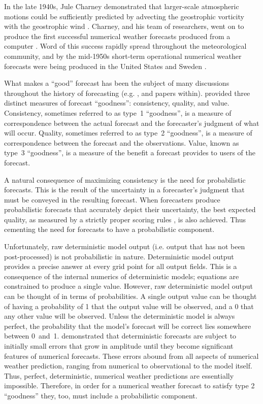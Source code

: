In the late 1940s, Jule Charney demonstrated that larger-scale atmospheric motions could be sufficiently predicted by advecting the geostrophic vorticity with the geostrophic wind \citep{Charney1947}.
Charney, and his team of researchers, went on to produce the first successful numerical weather forecasts produced from a computer \cite{Charney1950}.
Word of this success rapidly spread throughout the meteorological community, and by the mid-1950s short-term operational numerical weather forecasts were being produced in the United States and Sweden \citep{Lewis2005}.







What makes a ``good'' forecast has been the subject of many discussions throughout the history of forecasting (e.g. \citealp{Mascart1922, Winkler1968, Murphy1993}, \citealp{Murphy1996} and papers within).
\cite{Murphy1993} provided three distinct measures of forecast ``goodness'': consistency, quality, and value.
Consistency, sometimes referred to as \mbox{type 1} ``goodness'', is a measure of correspondence between the actual forecast and the forecaster's judgment of what will occur.
Quality, sometimes referred to as \mbox{type 2} ``goodness'', is a measure of correspondence between the forecast and the observations.
Value, known as \mbox{type 3} ``goodness'', is a measure of the benefit a forecast provides to users of the forecast.


A natural consequence of maximizing consistency is the need for probabilistic forecasts.
This is the result of the uncertainty in a forecaster's judgment that must be conveyed in the resulting forecast.
When forecasters produce probabilistic forecasts that accurately depict their uncertainty, the best expected quality, as measured by a strictly proper scoring rules \citep{Winkler1968}, is also achieved.
Thus cementing the need for forecasts to have a probabilistic component.


Unfortunately, raw deterministic model output (i.e. output that has not been post-processed) is not probabilistic in nature.
Deterministic model output provides a precise answer at every grid point for all output fields.
This is a consequence of the internal numerics of deterministic models; equations are constrained to produce a single value.
However, raw deterministic model output can be thought of in terms of probabilities.
A single output value can be thought of having a probability of 1 that the output value will be observed, and a 0 that any other value will be observed.
Unless the deterministic model is always perfect, the probability that the model's forecast will be correct lies somewhere between \mbox{0 and 1}.
\cite{Lorenz1963, Lorenz1965} demonstrated that deterministic forecasts are subject to initially small errors that grow in amplitude until they become significant features of numerical forecasts.
These errors abound from all aspects of numerical weather prediction, ranging from numerical to observational to the model itself.
Thus, perfect, deterministic, numerical weather predictions are essentially impossible.
Therefore, in order for a numerical weather forecast to satisfy type 2 ``goodness'' they, too, must include a probabilistic component.


